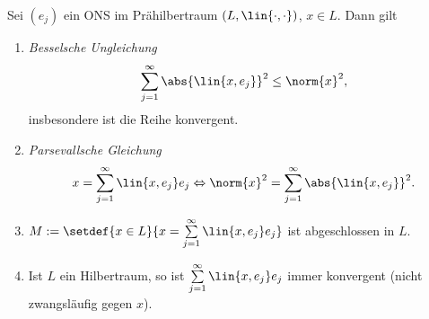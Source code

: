 \begin{prop}
\label{prop:1.10}
Sei $(e_j)$ ein ONS im Prähilbertraum $(L,\lin{\cdot,\cdot})$, $x\in L$. Dann
gilt
\begin{enumerate}[label=\arabic{*}.)]
\item\label{prop:1.10:1} \emph{Besselsche Ungleichung}
\begin{align*}
\sum\limits_{j=1}^\infty \abs{\lin{x,e_j}}^2 \le \norm{x}^2,
\end{align*}
insbesondere ist die Reihe konvergent.
\item\label{prop:1.10:2} \emph{Parsevallsche Gleichung}
\begin{align*}
x = \sum\limits_{j=1}^\infty \lin{x,e_j}e_j \Leftrightarrow \norm{x}^2 =
\sum\limits_{j=1}^\infty \abs{\lin{x,e_j}}^2.
\end{align*}
\item\label{prop:1.10:3} $M:= \setdef{x\in L}{x = \sum\limits_{j=1}^\infty
\lin{x,e_j}e_j}$ ist abgeschlossen in $L$.
\item\label{prop:1.10:4} Ist $L$ ein Hilbertraum, so ist
$\sum\limits_{j=1}^\infty \lin{x,e_j}e_j$ immer konvergent (nicht zwangsläufig gegen $x$).\fishhere
\end{enumerate}
\end{prop}
